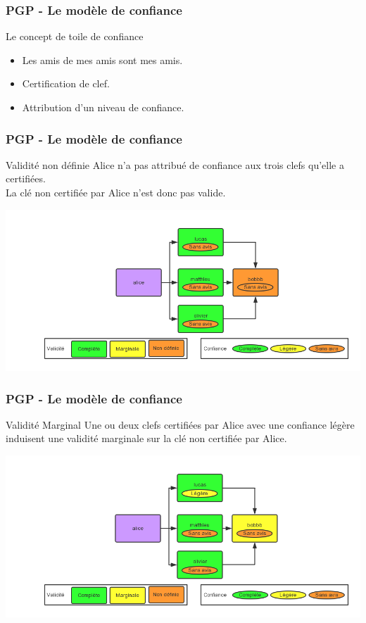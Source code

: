 \begin{frame}
  \frametitle{\color{white}PGP - Le modèle de confiance}
    \begin{block}{Le concept de toile de confiance}
    	\begin{itemize}
	  \item Les amis de mes amis sont mes amis.
	  \item Certification de clef.
	  \item Attribution d'un niveau de confiance.
       \end{itemize} 
    \end{block}
\end{frame}
\begin{frame}
  \frametitle{\color{white}PGP - Le modèle de confiance}
    \begin{block}{Validité non définie}
      Alice n'a pas attribué de confiance aux trois clefs qu'elle a certifiées.\\
      La clé non certifiée par Alice n'est donc pas valide.
    \end{block}
    \includegraphics[scale=0.3]{tdcdemoUndefined.png}
\end{frame}
\begin{frame}
  \frametitle{\color{white}PGP - Le modèle de confiance}
    \begin{block}{Validité Marginal}
      Une ou deux clefs certifiées par Alice avec une confiance légère 
      induisent une validité marginale sur la clé non certifiée par Alice.
    \end{block}
    \includegraphics[scale=0.3]{tdcdemoMarginal.png}
\end{frame}
